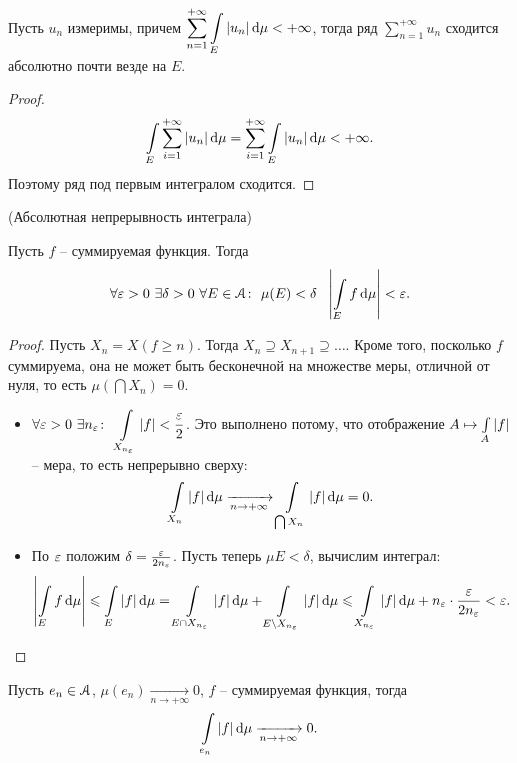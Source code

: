 \begin{corollary}
    Пусть $u_n$ измеримы, причем $\displaystyle \sum_{n = 1}^{+\infty}{\int\limits_E{|u_n| \,\mathrm{d}\mu}} < +\infty$,
    тогда ряд $\displaystyle \sum_{n = 1}^{+\infty}{u_n}$ сходится абсолютно почти везде на $E$.
\end{corollary}
\begin{proof}
\[
    \int\limits_{E}{\sum_{i = 1}^{+\infty}{|u_n|} \,\mathrm{d}\mu} = \sum_{i = 1}^{+\infty}{\int\limits_{E}{|u_n| \,\mathrm{d}\mu}} < +\infty
.\]
    Поэтому ряд под первым интегралом сходится.
\end{proof}

\begin{theorem}(Абсолютная непрерывность интеграла)

    Пусть $f$ -- суммируемая функция. Тогда
\[
    \forall \varepsilon > 0~ \exists \delta > 0~ \forall E \in \mathcal{A}\colon~ \mu(E) < \delta
    ~~ \left|\int\limits_E{f \,\mathrm{d}\mu}\right| < \varepsilon
.\] 
\end{theorem}
\begin{proof}
    Пусть $X_n = X(f \geqslant n)$. Тогда $X_n \supseteq X_{n + 1} \supseteq \ldots$. Кроме того,
    посколько $f$ суммируема, она не может быть бесконечной на множестве меры, отличной от нуля, 
    то есть $\mu(\bigcap{X_n}) = 0$.
    \begin{itemize}
        \item $\displaystyle \forall \varepsilon > 0~ \exists n_\varepsilon\colon~ \int\limits_{X_{n_\varepsilon}}{|f|} < \frac{\varepsilon}{2}$.
            Это выполнено потому, что отображение $A \mapsto \int\limits_{A}{|f|}$ -- мера, то есть
            непрерывно сверху:
\[
    \int\limits_{X_n}{|f| \,\mathrm{d}\mu} \xrightarrow[n \to +\infty]{} \int\limits_{\bigcap{X_n}}{|f| \,\mathrm{d}\mu} = 0
.\]
        \item По $\varepsilon$ положим $\delta = \frac{\varepsilon}{2 n_\varepsilon}$. Пусть теперь $\mu{E} < \delta$,
            вычислим интеграл:
\[
    \left|\int\limits_{E}{f \,\mathrm{d}\mu}\right| \leqslant \int\limits_{E}{|f| \,\mathrm{d}\mu} =
    \int\limits_{E \cap X_{n_\varepsilon}}{|f| \,\mathrm{d}\mu} + \int\limits_{E \setminus X_{n_\varepsilon}}{|f| \,\mathrm{d}\mu} \leqslant
    \int\limits_{X_{n_\varepsilon}}{|f| \,\mathrm{d}\mu} + n_\varepsilon \cdot \frac{\varepsilon}{2 n_\varepsilon} < \varepsilon
.\]
    \end{itemize}
\end{proof}

\begin{corollary}
    Пусть $e_n \in \mathcal{A}$, $\mu(e_n) \xrightarrow[n \to +\infty]{} 0$, $f$ -- суммируемая функция,
    тогда
\[
    \int\limits_{e_n}{|f| \,\mathrm{d}\mu} \xrightarrow[n \to +\infty]{} 0
.\] 
\end{corollary}
